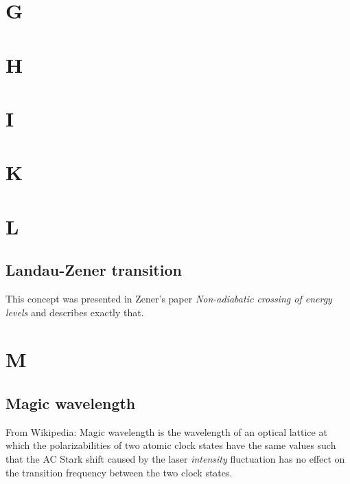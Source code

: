 \documentclass{book}
\theoremstyle{definition}
\begin{document}


\chapter*{G}
\chapter*{H}
\chapter*{I}
\chapter*{K}
\chapter*{L}


\section*{Landau-Zener transition}


This concept was presented in Zener's paper \textit{Non-adiabatic crossing of energy levels} \cite{zener1932non} and describes exactly that. 




\chapter*{M}



\section*{Magic wavelength}



From Wikipedia: Magic wavelength is the wavelength of an optical lattice at which the polarizabilities of two atomic clock states have the same values such that the AC Stark shift caused by the laser \textit{intensity} fluctuation has no effect on the transition frequency between the two clock states.\\
\end{document}
